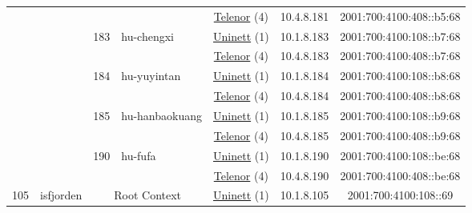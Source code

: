 \begin{small}
\begin{center}
\begin{longtable}{|c|c|c|c|c|c|c|c|}
  &  &  &  & \multicolumn{2}{|c|}{\tiny{\href{https://www.telenor.no}{Telenor} (4)}} & \tiny{10.4.8.181} & \tiny{2001:700:4100:408::b5:68} \\* \cline{3-3}\cline{4-4}\cline{5-5}\cline{6-6}\cline{7-7}\cline{8-8}
  &  & \multirow{2}{*}{\tiny{183}} & \multicolumn{1}{|l|}{\multirow{2}{*}{\tiny{hu-chengxi}}} & \multicolumn{2}{|c|}{\tiny{\href{https://www.uninett.no}{Uninett} (1)}} & \tiny{10.1.8.183} & \tiny{2001:700:4100:108::b7:68} \\* \cline{5-5}\cline{6-6}\cline{7-7}\cline{8-8}
  &  &  &  & \multicolumn{2}{|c|}{\tiny{\href{https://www.telenor.no}{Telenor} (4)}} & \tiny{10.4.8.183} & \tiny{2001:700:4100:408::b7:68} \\* \cline{3-3}\cline{4-4}\cline{5-5}\cline{6-6}\cline{7-7}\cline{8-8}
  &  & \multirow{2}{*}{\tiny{184}} & \multicolumn{1}{|l|}{\multirow{2}{*}{\tiny{hu-yuyintan}}} & \multicolumn{2}{|c|}{\tiny{\href{https://www.uninett.no}{Uninett} (1)}} & \tiny{10.1.8.184} & \tiny{2001:700:4100:108::b8:68} \\* \cline{5-5}\cline{6-6}\cline{7-7}\cline{8-8}
  &  &  &  & \multicolumn{2}{|c|}{\tiny{\href{https://www.telenor.no}{Telenor} (4)}} & \tiny{10.4.8.184} & \tiny{2001:700:4100:408::b8:68} \\* \cline{3-3}\cline{4-4}\cline{5-5}\cline{6-6}\cline{7-7}\cline{8-8}
  &  & \multirow{2}{*}{\tiny{185}} & \multicolumn{1}{|l|}{\multirow{2}{*}{\tiny{hu-hanbaokuang}}} & \multicolumn{2}{|c|}{\tiny{\href{https://www.uninett.no}{Uninett} (1)}} & \tiny{10.1.8.185} & \tiny{2001:700:4100:108::b9:68} \\* \cline{5-5}\cline{6-6}\cline{7-7}\cline{8-8}
  &  &  &  & \multicolumn{2}{|c|}{\tiny{\href{https://www.telenor.no}{Telenor} (4)}} & \tiny{10.4.8.185} & \tiny{2001:700:4100:408::b9:68} \\* \cline{3-3}\cline{4-4}\cline{5-5}\cline{6-6}\cline{7-7}\cline{8-8}
  &  & \multirow{2}{*}{\tiny{190}} & \multicolumn{1}{|l|}{\multirow{2}{*}{\tiny{hu-fufa}}} & \multicolumn{2}{|c|}{\tiny{\href{https://www.uninett.no}{Uninett} (1)}} & \tiny{10.1.8.190} & \tiny{2001:700:4100:108::be:68} \\* \cline{5-5}\cline{6-6}\cline{7-7}\cline{8-8}
  &  &  &  & \multicolumn{2}{|c|}{\tiny{\href{https://www.telenor.no}{Telenor} (4)}} & \tiny{10.4.8.190} & \tiny{2001:700:4100:408::be:68} \\ \hline
 \multirow{26}{*}{\tiny{105}} & \multicolumn{1}{|l|}{\multirow{26}{*}{\tiny{isfjorden}}} & \multicolumn{2}{|c|}{\multirow{2}{*}{\tiny{Root Context}}} & \multicolumn{2}{|c|}{\tiny{\href{https://www.uninett.no}{Uninett} (1)}} & \tiny{10.1.8.105} & \tiny{2001:700:4100:108::69} \\* \cline{5-5}\cline{6-6}\cline{7-7}\cline{8-8}

\end{longtable}
\end{center}
\end{small}
